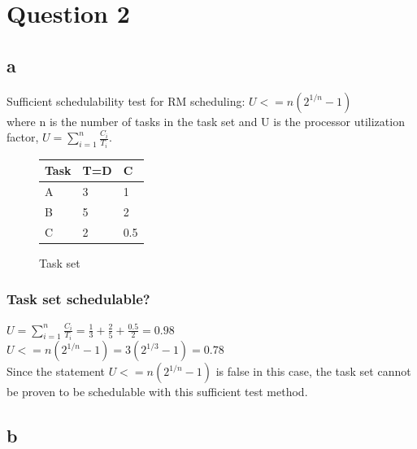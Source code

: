 \section{Question 2}
        \subsection{\textbf{a}}
            Sufficient schedulability test for RM scheduling: $U <= n(2^{1/n} - 1)$ \\ where n is the number of tasks in the task set and U is the processor utilization factor, $U = \sum_{i=1}^{n} \frac{C_i}{T_i}$. 

        \renewcommand{\arraystretch}{1.4}
        \begin{figure}[H]
        \centering
        \begin{minipage}{0.5\textwidth}
            \begin{table}[H]
            \centering
            \begin{tabular}{|l|l|l|}
                \hline
                \textbf{Task}   & \textbf{T=D}  & \textbf{C}  \\ \hline
                A               & 3             & 1           \\ \hline
                B               & 5             & 2           \\ \hline
                C               & 2             & 0.5         \\ \hline

            \end{tabular}
            \end{table}
        \end{minipage}%
        \caption{Task set}
        \label{fig:Taskset}
        \end{figure}
    \renewcommand{\arraystretch}{1.0}

        \subsubsection{\textbf{Task set schedulable?}}
        $U = \sum_{i=1}^{n} \frac{C_i}{T_i} = \frac{1}{3} + \frac{2}{5} + \frac{0.5}{2} = 0.98$ \\
        $U <= n(2^{1/n} - 1) = 3(2^{1/3} - 1) = 0.78$ \\
        Since the statement $U <= n(2^{1/n} - 1)$ is false in this case, the task set cannot be proven to be schedulable with this sufficient test method.

        \subsection{b}
